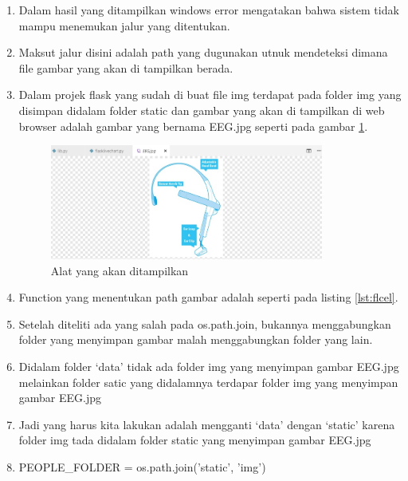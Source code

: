 \begin{enumerate}
\item Dalam hasil yang ditampilkan windows error mengatakan  bahwa  sistem tidak mampu menemukan jalur yang ditentukan.
\item Maksut jalur disini adalah path yang dugunakan utnuk mendeteksi dimana file gambar yang akan di tampilkan berada.
\item Dalam projek flask yang sudah di buat file img terdapat pada folder img yang disimpan didalam folder static dan gambar yang akan di tampilkan di web browser adalah gambar yang bernama EEG.jpg seperti pada gambar \ref{fig:alat}.
\begin{figure}[!htbp]
	\centerline{\includegraphics[width=0.85\textwidth]{figures/9/alat.PNG}}
	\caption{Alat yang akan ditampilkan}
	\label{fig:alat}
\end{figure}

\item Function yang menentukan path gambar adalah seperti pada listing \ref{lst:flcel}.


\item Setelah diteliti ada yang salah pada os.path.join, bukannya menggabungkan folder yang menyimpan gambar malah menggabungkan folder yang lain. 
\item Didalam folder ‘data’ tidak ada folder img yang menyimpan gambar EEG.jpg melainkan folder satic yang didalamnya terdapar folder img yang menyimpan gambar EEG.jpg 
\item Jadi yang harus kita lakukan adalah mengganti ‘data’ dengan ‘static’ karena folder img tada didalam folder static yang  menyimpan gambar EEG.jpg 
\item PEOPLE\_FOLDER = os.path.join('static', 'img')
\end{enumerate}